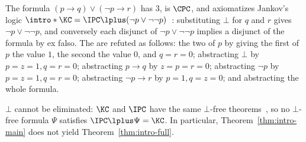 \begin{example}\label{ex:order3}
The formula $(p\to q)\vee(\neg p\to r)$ has  $3$, is  $\CPC$, and axiomatizes Jankov's logic $\intro*\KC=\IPC\lplus(\neg p\vee\neg\neg p)$~\cite{Jan68b}:
substituting $\bot$ for $q$ and $r$ gives $\neg p\vee\neg\neg p$, and
conversely each disjunct of $\neg p\vee\neg\neg p$ implies a disjunct of
the formula by ex falso. The  are refuted as
follows: the two  of $p$ by giving the first 
of $p$ the value $1$, the second the value $0$, and $q=r=0$; abstracting $\bot$ by $p=z=1,q=r=0$; abstracting
$p\to q$ by $z=p=r=0$; abstracting $\neg p$ by $p=z=1,q=r=0$; abstracting
$\neg p\to r$ by $p=1,q=z=0$; and abstracting the whole formula.
\end{example}

\begin{remark}\label{rem:bot}
$\bot$ cannot be eliminated: $\KC$ and $\IPC$ have the same $\bot$-free
theorems~\cite{Jan68b}, so no $\bot$-free formula $\Psi$ satisfies
$\IPC\lplus\Psi=\KC$. In particular, Theorem~\ref{thm:intro-main} does not
yield Theorem~\ref{thm:intro-full}.
\end{remark}

